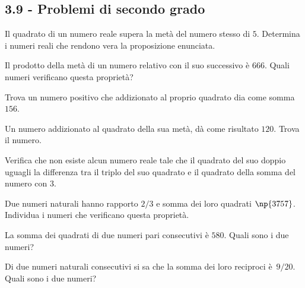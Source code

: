 \begin{multicols}{2}
\subsection*{3.9 - Problemi di secondo grado}

\begin{esercizio}[\Ast]
 \label{ese:3.123}
Il quadrato di un numero reale supera la metà del numero stesso di $ 5 $.
Determina i numeri reali che rendono vera la proposizione enunciata.
\end{esercizio}

\begin{esercizio}[\Ast]
 \label{ese:3.124}
Il prodotto della metà di un numero relativo con il suo successivo è $ 666 $.
Quali numeri verificano questa proprietà?
\end{esercizio}

\begin{esercizio}
 \label{ese:3.125}
Trova un numero positivo che addizionato al proprio quadrato dia come somma $ 156 $.
\end{esercizio}

\begin{esercizio}
 \label{ese:3.126}
Un numero addizionato al quadrato della sua metà, dà come risultato $ 120 $.
Trova il numero.
\end{esercizio}

\begin{esercizio}
 \label{ese:3.127}
Verifica che non esiste alcun numero reale tale che il quadrato del suo
doppio uguagli la differenza tra il triplo del suo quadrato e il quadrato
della somma del numero con $3$.
\end{esercizio}

\begin{esercizio}[\Ast]
 \label{ese:3.128}
Due numeri naturali hanno rapporto $2/3$ e somma dei loro quadrati $\np{3757}$.
Individua i numeri che verificano questa proprietà.
\end{esercizio}

\begin{esercizio}[\Ast]
 \label{ese:3.129}
La somma dei quadrati di due numeri pari consecutivi è $ 580 $. Quali sono i
due numeri?
\end{esercizio}

\begin{esercizio}[\Ast]
 \label{ese:3.130}
Di due numeri naturali consecutivi si sa che la somma dei loro reciproci
è~$ 9/20 $. Quali sono i due numeri?
\end{esercizio}


\end{multicols}
